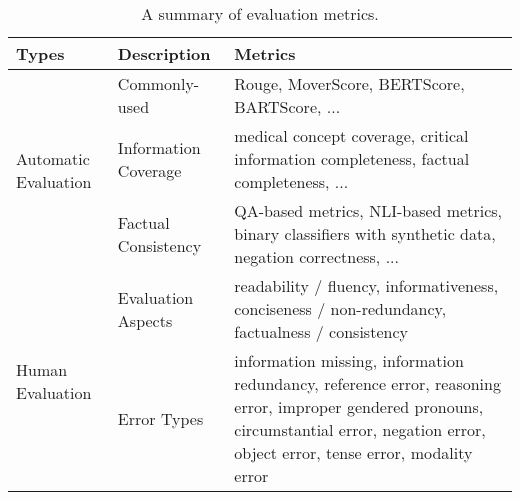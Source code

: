 \begin{table}[h]
	\centering
	\small
	\begin{tabular}{|l|l|p{6.8cm}|}
		\hline
		\textbf{Types} & \textbf{Description} & \textbf{Metrics} \\
		\hline
		\multirow{3}{*}{Automatic Evaluation} & Commonly-used & Rouge, MoverScore, BERTScore, BARTScore, ... \\
		\cline{2-3}
		 & Information Coverage & medical concept coverage, critical information completeness, factual completeness, ...\\
		 \cline{2-3}
		 & Factual Consistency & QA-based metrics, NLI-based metrics, binary classifiers with synthetic data, negation correctness, ...\\
		 \hline
		\multirow{3}{*}{Human Evaluation} & Evaluation Aspects& readability / fluency, informativeness, conciseness / non-redundancy, factualness / consistency\\
		\cline{2-3}
		& Error Types & {information missing, information redundancy, reference error, reasoning error, improper gendered pronouns, circumstantial error, negation error, object error, tense error, modality error} \\ 
		\hline
		
	\end{tabular}
	\caption{A summary of evaluation metrics.}
	\label{tab:eval-metrics}
\end{table}



